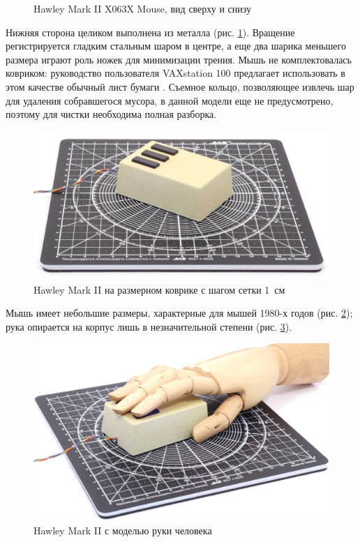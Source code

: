 \documentclass[11pt, a4paper]{article}
\begin{document}
\begin{figure}[h]
    \caption{Hawley Mark II X063X Mouse, вид сверху и снизу}
    \label{fig:DecVS10XTopAndBottom}
\end{figure}

Нижняя сторона целиком выполнена из металла (рис. \ref{fig:DecVS10XTopAndBottom}). Вращение регистрируется гладким стальным шаром в центре, а еще два шарика меньшего размера играют роль ножек для минимизации трения. Мышь не комплектовалась ковриком: руководство пользователя VAXstation 100 предлагает использовать в этом качестве обычный лист бумаги \cite{manual}.
 Съемное кольцо, позволяющее извлечь шар для удаления собравшегося мусора, в данной модели еще не предусмотрено, поэтому для чистки необходима полная разборка.

\begin{figure}[h]
    \centering
    \includegraphics[scale=0.5]{1983_hawley_mark_ii/size_30.jpg}
    \caption{Hawley Mark II на размерном коврике с шагом сетки 1~см}
    \label{fig:DecVS10XSize}
\end{figure}

Мышь имеет небольшие размеры, характерные для мышей 1980-х годов (рис. \ref{fig:DecVS10XSize}); рука опирается на корпус лишь в незначительной степени (рис. \ref{fig:DecVS10XHand}).

\begin{figure}[h]
    \centering
    \includegraphics[scale=0.5]{1983_hawley_mark_ii/hand_60.jpg}
    \caption{Hawley Mark II с моделью руки человека}
    \label{fig:DecVS10XHand}
\end{figure}
\end{document}
